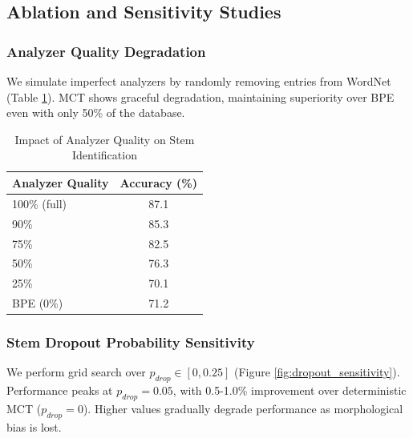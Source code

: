\documentclass[conference]{IEEEtran}
\begin{document}
\subsection{Ablation and Sensitivity Studies}

\subsubsection{Analyzer Quality Degradation}
We simulate imperfect analyzers by randomly removing entries from WordNet (Table \ref{tab:analyzer_degradation}). MCT shows graceful degradation, maintaining superiority over BPE even with only 50\% of the database.

\begin{table}[h]
\centering
\caption{Impact of Analyzer Quality on Stem Identification}
\label{tab:analyzer_degradation}
\begin{tabular}{lc}
\toprule
\textbf{Analyzer Quality} & \textbf{Accuracy (\%)} \\
\midrule
100\% (full) & 87.1 \\
90\% & 85.3 \\
75\% & 82.5 \\
50\% & 76.3 \\
25\% & 70.1 \\
BPE (0\%) & 71.2 \\
\bottomrule
\end{tabular}
\end{table}

\subsubsection{Stem Dropout Probability Sensitivity}
We perform grid search over $p_{drop} \in [0, 0.25]$ (Figure \ref{fig:dropout_sensitivity}). Performance peaks at $p_{drop} = 0.05$, with 0.5-1.0\% improvement over deterministic MCT ($p_{drop} = 0$). Higher values gradually degrade performance as morphological bias is lost.
\end{document}
